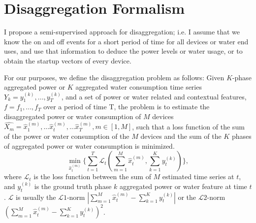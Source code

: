 \section{Disaggregation Formalism}
I propose a semi-supervised approach for disaggregation; i.e.
I assume that we know the on and off events for a short period of time for all devices or water end uses, 
and use that information to deduce the power levels or water usage, 
or to obtain the startup vectors of every device.

For our purposes, we define the disaggregation problem as follows:
Given $K$-phase aggregated power 
or $K$ aggregated water consumption time series 
$Y_k=y_1^{(k)}, ..., y_T^{(k)}$, and a set of
power or water related and contextual features, $f=f_1, ..., f_T$ over a period of time T, 
the problem is to estimate the disaggregated power or water consumption of $M$ devices 
$\hat{X_m }= \hat{x}_{1}^{(m)}, ...\hat{x}_{t}^{(m)}, ... \hat{x}_{T}^{(m)}, m\in[1, M]$, 
such that a loss function of the sum of the power or water consumption of the $M$
devices and the sum of the $K$ phases of aggregated power or water consumption is minimized. 
\begin{equation}
\label{eq_powerObj}
\min_{\hat{x}_{t}^{(m)}} \{ \sum_{t=1}^T \mathscr{L}_t(\sum_{m=1}^M \hat{x}_{t}^{(m)}, \sum_{k=1}^Ky_t^{(k)}) \},
\end{equation}
where $\mathscr{L}_t$ is the loss function between 
the sum of $M$ estimated time series at $t$, 
and $y_t^{(k)}$ is the ground truth phase $k$ aggregated power or water feature at time $t$. 
$\mathscr{L}$ is usually the $\mathscr{L}1$-norm $|\sum_{m=1}^M \hat{x}_{t}^{(m)} -\sum_{k=1}^K y_t^{(k)}|$
or the $\mathscr{L}2$-norm $(\sum_{m=1}^M \hat{x}_{t}^{(m)}-\sum_{k=1}^Ky_t^{(k)})^2$.


